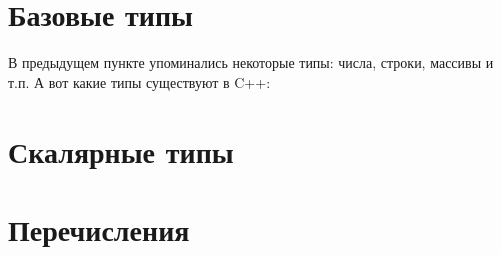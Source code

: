 \documentclass[book.tex]{subfiles}
\begin{document}
\section*{Базовые типы}

В предыдущем пункте упоминались некоторые типы: числа, строки, массивы и т.п. А вот какие типы существуют в C++:

\section*{Скалярные типы}

\section*{Перечисления}
\end{document}
